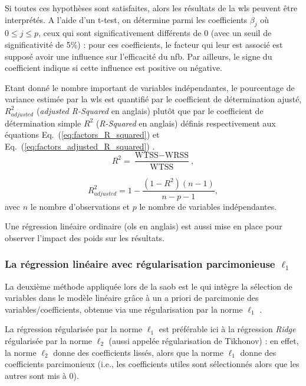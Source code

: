Si toutes ces hypothèses sont satisfaites, alors les résultats de la \gls{wls} peuvent être interprétés. A l'aide d'un t-test, on détermine  
parmi les coefficients $\beta_{j}$ où $0 \leq j \leq p$, ceux qui sont significativement différents de 0 (avec un seuil de significativité de 5\%) : 
pour ces coefficients, le facteur qui leur est associé est supposé avoir une influence sur l'efficacité du \gls{nfb}. Par ailleurs, 
le signe du coefficient indique si cette influence est positive ou négative. 

Etant donné le nombre important de variables indépendantes, le pourcentage de variance estimée par la \gls{wls} est quantifié par le coefficient de 
détermination ajusté, $R^2_{adjusted}$ (\textit{adjusted R-Squared} en anglais) plutôt que par le coefficient de détermination simple $R^2$ (\textit{R-Squared} en anglais)
définis respectivement aux équations Eq.~(\ref{eq:factors_R_squared}) et Eq.~(\ref{eq:factors_adjusted_R_squared}) \citep{James2013}.
\begin{equation}
\label{eq:factors_R_squared}
R^2 = \frac{ \text{WTSS} - \text{WRSS} }{ \text{WTSS} }, 
\end{equation}

\begin{equation}
\label{eq:factors_adjusted_R_squared}
R^2_{adjusted} = 1 - \frac{ (1 - R^2) (n - 1) }{ n - p - 1 }, 
\end{equation}
avec $n$ le nombre d'observations et $p$ le nombre de variables indépendantes.


Une régression linéaire ordinaire (\gls{ols} en anglais) est aussi mise en place pour observer l'impact des poids sur les résultats. 

\subsubsection{La régression linéaire avec régularisation parcimonieuse $\ell_1$}

La deuxième méthode appliquée lors de la \gls{saob} est le  qui intègre la sélection de variables dans le modèle linéaire grâce 
à un a priori de parcimonie des variables/coefficients, obtenue via une régularisation par la norme $\ell_1$ \citep{Tibshirani1996}.

La régression régularisée par la norme $\ell_1$ est préférable ici à la régression \textit{Ridge} \citep{James2013} régularisée par 
la norme $\ell_2$ (aussi appelée régularisation de Tikhonov) : en effet, la norme $\ell_2$ donne des coefficients lissés, alors que la norme $\ell_1$ donne des coefficients parcimonieux 
(i.e., les coefficients utiles sont sélectionnés alors que les autres sont mis à 0). 

